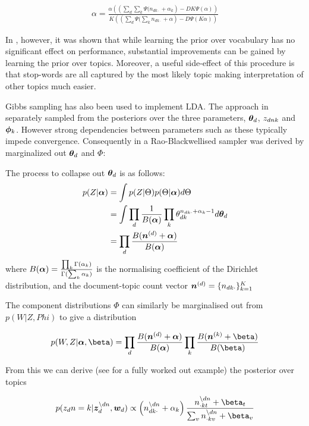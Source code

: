\begin{align}
\alpha = \frac{\alpha \left( \left(\sum_d \sum_k \Psi(n_{dk\cdot} + \alpha_k \right) - DK \Psi (\alpha)\right)}{K \left( \left(\sum_d  \Psi(\sum_k n_{dk\cdot} + \alpha \right) - D \Psi (K \alpha)\right)}
\end{align}

In \cite{Wallach2009a}, however, it was shown that while learning the prior over vocabulary has no significant effect on performance, substantial improvements can be gained by learning the prior over topics. Moreover, a useful side-effect of this procedure is that stop-words are all captured by the most likely topic making interpretation of other topics much easier.

Gibbs sampling has also been used to implement LDA. The approach in  \cite{Pritchard2000} separately sampled from the posteriors over the three parameters, ${ \bm \theta_d }$, ${ z_{dnk} }$ and ${ \bm \phi_k }$. However strong dependencies between parameters such as these typically impede convergence\cite{CasellaRobert1999}. Consequently in \cite{Griffiths2004} a Rao-Blackwellised sampler was derived by marginalized out ${ \bm \theta_d }$ and $\Phi$:

The process to collapse out ${ \bm \theta_d }$ is as follows:
\begin{align}
p(Z|\bm \alpha) & = \int p(Z|\Theta)p(\Theta|\bm \alpha) d\Theta \\
& = \int \prod_d \frac{1}{ {B(\bm \alpha)} } \prod_k \theta_{dk}^{n_{dk\cdot} + \alpha_k - 1} d{ \bm \theta_d } \\
& = \prod_d \frac{B(\bm n^{(d)} + \bm \alpha)}{B(\bm \alpha)}
\end{align}
where $B(\bm \alpha) = \frac{\prod_k \Gamma(\alpha_k)}{\Gamma(\sum_k \alpha_k)}$ is the normalising coefficient of the Dirichlet distribution, and the document-topic count vector $\bm n^{(d)} = \{ n_{dk\cdot} \}_{k=1}^K$

The component distributions $\Phi$ can similarly be marginalised out from $p(W|Z,Phi)$ to give a distribution

\begin{align}
p(W,Z|\vv{\alpha},\vv{\beta}) = \prod_d \frac{B(\vv{n}^{(d)} + \vv{\alpha})}{B(\vv{\alpha})} \prod_k \frac{B(\vv{n}^{(k)} + \vv{\beta})}{B(\vv{\beta})}
\end{align}

From this we can derive (see \cite{Heinrich2005} for a fully worked out example) the posterior over topics

\begin{align}
p(z_dn = k | \vv{z}_{d}^{\setminus dn}, \vv{w}_d)
\propto
\left(n_{dk\cdot}^{\setminus dn} + \alpha_k \right)
\frac{n_{\cdot kt}^{\setminus dn} + \beta_t}{\sum_v n_{\cdot kv}^{\setminus dn} + \beta_v}
\end{align}

